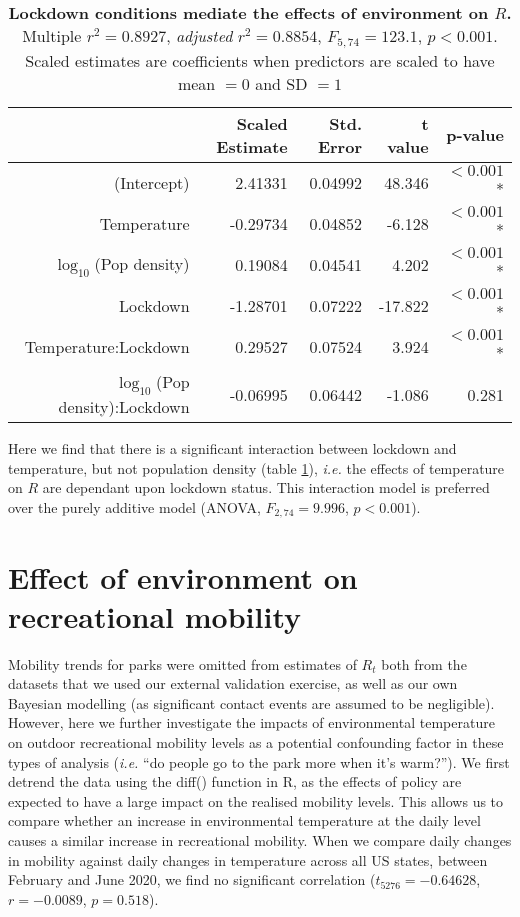 \documentclass[12pt,english,a4paper]{article}
\begin{document}
\begin{table}[ht]
\centering
\caption{{\bf Lockdown conditions mediate the effects of environment on $R$.} Multiple $r^2 = 0.8927$, \textsl{adjusted} $r^2 = 0.8854$, $F_{5,74} = 123.1$, $p < 0.001$. Scaled estimates are coefficients when predictors are scaled to have mean $= 0$ and SD $= 1$}
\begin{tabular}{rrrrr}
  \hline
 & Scaled Estimate & Std. Error & t value & p-value \\ 
  \hline
  (Intercept) & 2.41331 & 0.04992 & 48.346 & $< 0.001$* \\ 
  Temperature & -0.29734 & 0.04852 & -6.128 & $< 0.001$* \\ 
  $\log_{10}$(Pop density) & 0.19084 & 0.04541 & 4.202 & $< 0.001$* \\ 
  Lockdown & -1.28701 & 0.07222 & -17.822 & $< 0.001$* \\ 
  Temperature:Lockdown & 0.29527 & 0.07524 & 3.924 & $< 0.001$* \\ 
  $\log_{10}$(Pop density):Lockdown & -0.06995 & 0.06442 & -1.086 & 0.281  \\ 
   \hline
\end{tabular}
\label{tab:interaction_model}
\end{table}

Here we find that there is a significant interaction between lockdown and temperature, but not population density (table \ref{tab:interaction_model}), \emph{i.e.} the effects of temperature on $R$ are dependant upon lockdown status. This interaction model is preferred over the purely additive model (ANOVA, $F_{2,74} = 9.996$, $p < 0.001$).




\section{Effect of environment on recreational mobility}

Mobility trends for parks were omitted from estimates of $R_t$ both from the datasets that we used our external validation exercise, as well as our own Bayesian modelling (as significant contact events are assumed to be negligible). However, here we further investigate the impacts of environmental temperature on outdoor recreational mobility levels as a potential confounding factor in these types of analysis (\emph{i.e.} ``do people go to the park more when it's warm?''). 
We first detrend the data using the diff() function in R, as the effects of policy are expected to have a large impact on the realised mobility levels. This allows us to compare whether an increase in environmental temperature at the daily level causes a similar increase in recreational mobility. When we compare daily changes in mobility against daily changes in temperature across all US states, between February and June 2020, we find no significant correlation ($t_{5276} = -0.64628$, $r = -0.0089$, $p = 0.518$). 
\end{document}
